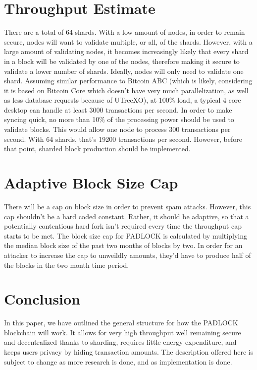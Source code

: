 \documentclass[12pt, letterpaper]{article}
\begin{document}
\section{Throughput Estimate}
There are a total of 64 shards. With a low amount of nodes, in order to remain
secure, nodes will want to validate multiple, or all, of the shards. However,
with a large amount of validating nodes, it becomes increasingly likely that
every shard in a block will be validated by one of the nodes, therefore making
it secure to validate a lower number of shards. Ideally, nodes will only need to
validate one shard. Assuming similar performance to Bitcoin ABC (which is
likely, considering it is based on Bitcoin Core which doesn't have very much
parallelization, as well as less database requests because of UTreeXO), at 100\%
load, a typical 4 core desktop can handle at least 3000 transactions per second.
In order to make syncing quick, no more than 10\% of the processing power should
be used to validate blocks. This would allow one node to process 300
transactions per second. With 64 shards, that's 19200 transactions per second.
However, before that point, sharded block production should be implemented.

\section{Adaptive Block Size Cap}
There will be a cap on block size in order to prevent spam attacks. However,
this cap shouldn't be a hard coded constant. Rather, it should be adaptive, so
that a potentially contentious hard fork isn't required every time the
throughput cap starts to be met. The block size cap for PADLOCK is calculated by
multiplying the median block size of the past two months of blocks by two. In
order for an attacker to increase the cap to unweildly amounts, they'd have to
produce half of the blocks in the two month time period.

\section{Conclusion}
In this paper, we have outlined the general structure for how the PADLOCK
blockchain will work. It allows for very high throughput well remaining secure
and decentralized thanks to sharding, requires little energy expenditure, and
keeps users privacy by hiding transaction amounts. The description offered here
is subject to change as more research is done, and as implementation is done.

\printbibliography
\end{document}

